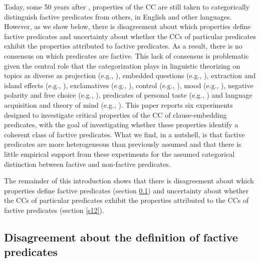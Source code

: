 \documentclass[11pt,fleqn]{article}
\newcommand{\6}{\mbox{$[\hspace*{-.6mm}[$}}
\newcommand{\9}{\mbox{$]\hspace*{-.6mm}]$}}
\begin{document}
Today, some 50 years after \citealt{kiparsky-kiparsky70}, properties of the CC are still taken to categorically distinguish factive predicates from others, in English and other languages. However, as we show below, there is disagreement about which properties define factive predicates and uncertainty about whether the CCs of particular predicates exhibit the properties attributed to factive predicates. As a result, there is no consensus on which predicates are factive. This lack of consensus is problematic given the central role that the categorization plays in linguistic theorizing on topics as diverse as projection (e.g., \citealt{karttunen-peters79,vds92}), embedded questions (e.g., \citealt{hintikka1975,guerzoni-sharvit2007,spector-egre2015}), extraction and island effects (e.g., \citealt{hukari-levine1995,rooryck2000,abrusan2014}), exclamatives (e.g., \citealt{zanuttini-portner2003}), control (e.g., \citealt{landau2001}), mood (e.g., \citealt{van-gelderen2004,givon95,heycock2006,giannakidou-mari2015}), negative polarity and free choice (e.g., \citealt{giannakidou1998,giannakidou2001}), predicates of personal taste (e.g., \citealt{lasersohn2009}) and language acquisition and theory of mind (e.g., \citealt{devillers2005}). This paper reports six experiments designed to investigate critical properties of the CC of clause-embedding predicates, with the goal of investigating whether these properties identify a coherent class of factive predicates. What we find, in a nutshell, is that factive predicates are more heterogeneous than previously assumed and that there is little empirical support from these experiments for the assumed categorical distinction between factive and non-factive predicates.

The remainder of this introduction shows that there is disagreement about which properties define factive predicates (section \ref{s11}) and uncertainty about whether the CCs of particular predicates exhibit the properties attributed to the CCs of factive predicates (section \ref{s12}).




	
\subsection{Disagreement about the definition of factive predicates}\label{s11}

\end{document}
